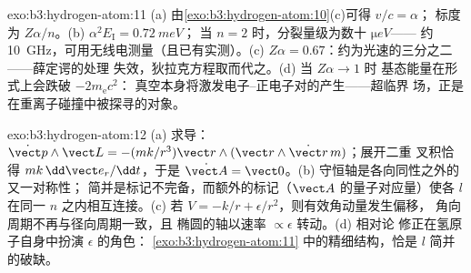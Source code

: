 \begin{solution}{exo:b3:hydrogen-atom:11}
(a) 由\cref{exo:b3:hydrogen-atom:10}(c)可得 $v/c = \alpha$；
标度为 $Z\alpha/n$。(b) $\alpha^2E_{\text{I}} = \qty{0.72}{meV}$；
当 $n = 2$ 时，分裂量级为数十 $\unit{\micro eV}$——
约 \qty{10}{GHz}，可用无线电测量（且已有实测）。(c) $Z\alpha =
0.67$：约为光速的三分之二——薛定谔的处理
失效，狄拉克方程取而代之。(d) 当 $Z\alpha \to 1$ 时
基态能量在形式上会跌破 $-2m_{\text{e}}c^2$：
真空本身将激发电子–正电子对的产生——超临界
场，正是在重离子碰撞中被探寻的对象。
\end{solution}

\begin{solution}{exo:b3:hydrogen-atom:12}
(a) 求导：$\dot{\vect p}\wedge\vect L = -(mk/r^3)\vect
r\wedge(\vect r\wedge\dot{\vect r}\,m)$；展开二重
叉积恰得 $mk\,\dd\vect e_r/\dd t$，于是 $\dot{\vect A} =
\vect 0$。(b) 守恒轴是各向同性之外的又一对称性；
简并是标记不完备，而额外的标记（$\vect
A$ 的量子对应量）使各 $l$ 在同一 $n$ 之内相互连接。(c) 若
$V = -k/r + \epsilon/r^2$，则有效角动量发生偏移，
角向周期不再与径向周期一致，且
椭圆的轴以速率 $\propto\epsilon$ 转动。(d) 相对论
修正在氢原子自身中扮演 $\epsilon$ 的角色：
\cref{exo:b3:hydrogen-atom:11} 中的精细结构，恰是
$l$ 简并的破缺。
\end{solution}


